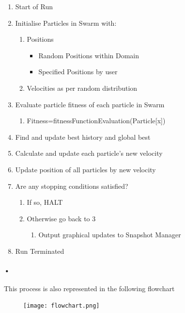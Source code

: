 \documentclass[11pt]{article}
\begin{document}
\begin{enumerate}
\item Start of Run
\item Initialise Particles in Swarm with:
	\begin{enumerate}
	\item Positions
		\begin{itemize}
		\item Random Positions within Domain
		\item Specified Positions by user

		\end{itemize}	 
	\item Velocities as per random distribution
		
	\end{enumerate}
	\item Evaluate particle fitness of each particle in Swarm
		\begin{enumerate}
		\item Fitness=fitnessFunctionEvaluation(Particle[x])
		\end{enumerate}
\item Find and update best history and global best
\item Calculate and update each particle's new velocity
\item Update position of all particles by new velocity  
\item	Are any stopping conditions satisfied?
	\begin{enumerate}
	\item If so, HALT
	\item Otherwise go back to 3
		\begin{enumerate}
		\item Output graphical updates to Snapshot Manager
		\end{enumerate}
	\end{enumerate}
	
\item Run Terminated	
\end{enumerate}

\paragraph{•}
This process is also represented in the following flowchart
\begin{figure}[H]
	\texttt{[image: flowchart.png]}
\end{figure}
\end{document}
